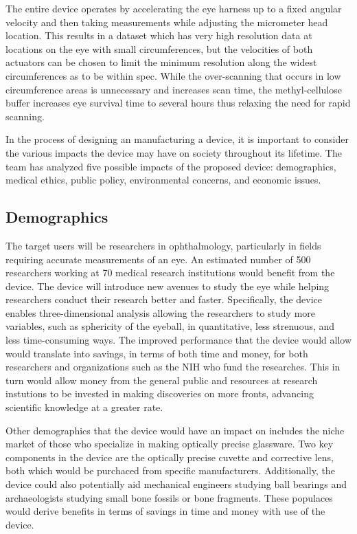 \documentclass{article}
\begin{document}
The entire device operates by accelerating the eye harness up to a
fixed angular velocity and then taking measurements while adjusting
the micrometer head location. This results in a dataset which has very
high resolution data at locations on the eye with small
circumferences, but the velocities of both actuators can be chosen to
limit the minimum resolution along the widest circumferences as to be
within spec. While the over-scanning that occurs in low circumference
areas is unnecessary and increases scan time, the methyl-cellulose
buffer increases eye survival time to several hours thus relaxing the
need for rapid scanning.

In the process of designing an manufacturing a device, it is important
to consider the various impacts the device may have on society
throughout its lifetime. The team has analyzed five possible impacts
of the proposed device: demographics, medical ethics, public policy,
environmental concerns, and economic issues.


\subsection{Demographics}
\label{sec:Demographics}

The target users will be researchers in ophthalmology, particularly in
fields requiring accurate measurements of an eye. An estimated number
of 500 researchers working at 70 medical research institutions would
benefit from the device. The device will introduce new avenues to
study the eye while helping researchers conduct their research better
and faster. Specifically, the device enables three-dimensional
analysis allowing the researchers to study more variables, such as
sphericity of the eyeball, in quantitative, less strenuous, and less
time-consuming ways. The improved performance that the device would
allow would translate into savings, in terms of both time and money,
for both researchers and organizations such as the NIH who fund the
researches. This in turn would allow money from the general public and
resources at research instutions to be invested in making discoveries
on more fronts, advancing scientific knowledge at a greater
rate. 

Other demographics that the device would have an impact on includes
the niche market of those who specialize in making optically precise
glassware. Two key components in the device are the optically precise
cuvette and corrective lens, both which would be purchaced from
specific manufacturers. Additionally, the device could also
potentially aid mechanical engineers studying ball bearings and
archaeologists studying small bone fossils or bone fragments. These
populaces would derive benefits in terms of savings in time and money
with use of the device.
\end{document}
